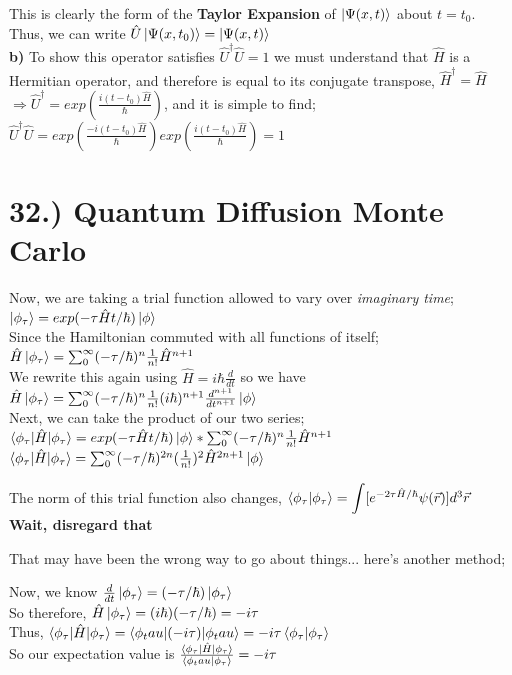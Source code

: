 \documentclass[12pt]{article}
\begin{document}
This is clearly the form of the \textbf{Taylor Expansion} of $\ket{\Psi(x,t)}$ about $t=t_0$. Thus, we can write $\hat{U}\ket{\Psi(x,t_0)}=\ket{\Psi(x,t)}$\\

\textbf{b) } To show this operator satisfies $\hat{U}^\dagger\hat{U}=1$ we must understand that $\hat{H}$ is a Hermitian operator, and therefore is equal to its conjugate transpose, $\hat{H}^\dagger=\hat{H}$\\

$\Rightarrow\hat{U}^\dagger=exp(\frac{i(t-t_0)\hat{H}}{\hbar})$, and it is simple to find;\\

$\hat{U}^\dagger\hat{U}=exp(\frac{-i(t-t_0)\hat{H}}{\hbar})exp(\frac{i(t-t_0)\hat{H}}{\hbar})=1$\\

\section{32.) Quantum Diffusion Monte Carlo}

Now, we are taking a trial function allowed to vary over \textit{imaginary time};  $\ket{\phi_\tau}=exp(-\tau\hat{H}t/\hbar)\ket{\phi}$\\

Since the Hamiltonian commuted with all functions of itself; $\hat{H}\ket{\phi_\tau}=\sum_0^\infty(-\tau/\hbar)^n\frac{1}{n!}\hat{H}^{n+1}$\\

We rewrite this again using $\hat{H}=i\hbar\frac{d}{dt}$ so we have $\hat{H}\ket{\phi_\tau}=\sum_0^\infty(-\tau/\hbar)^n\frac{1}{n!}(i\hbar)^{n+1}\frac{d^{n+1}}{dt^{n+1}}\ket{\phi}$\\


Next, we can take the product of our two series; $\braket{\phi_\tau|\hat{H}|\phi_\tau}=exp(-\tau\hat{H}t/\hbar)\ket{\phi}*\sum_0^\infty(-\tau/\hbar)^n\frac{1}{n!}\hat{H}^{n+1}$\\

$\braket{\phi_\tau|\hat{H}|\phi_\tau}=\sum_0^\infty(-\tau/\hbar)^{2n}(\frac{1}{n!})^2\hat{H}^{2n+1}\ket{\phi}$

The norm of this trial function also changes, $\braket{\phi_\tau|\phi_\tau}={\displaystyle\int}[e^{-2\tau\hat{H}/\hbar}\psi(\vec{r})]d^3\vec{r}$\\

\textbf{Wait, disregard that}

That may have been the wrong way to go about things... here's another method;

Now, we know $\frac{d}{dt}\ket{\phi_\tau}=(-\tau/\hbar)\ket{\phi_\tau}$\\

So therefore, $\hat{H}\ket{\phi_\tau}=(i\hbar)(-\tau/\hbar)=-i\tau$\\

Thus, $\braket{\phi_\tau|\hat{H}|\phi_\tau}=\braket{\phi_tau|(-i\tau)|\phi_tau}=-i\tau\braket{\phi_\tau|\phi_\tau}$\\

So our expectation value is $\frac{\braket{\phi_\tau|\hat{H}|\phi_\tau}}{\braket{\phi_tau|\phi_\tau}}=-i\tau$\\
\end{document}
